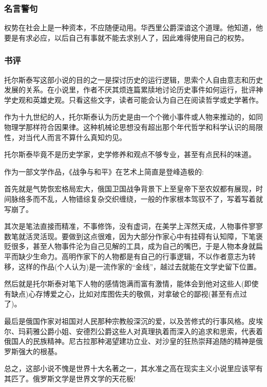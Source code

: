 \subsubsection{名言警句}

权势在社会上是一种资本，不应随便动用。华西里公爵深谙这个道理。他知道，他要是有求必应，以后自己有事就不能去求别人了，因此难得使用自己的权势。


\subsubsection{书评}
托尔斯泰写这部小说的目的之一是探讨历史的运行逻辑，思索个人自由意志和历史发展的关系。在小说里，作者不厌其烦连篇累牍地讨论历史事件如何运行，批评神学史观和英雄史观。只看这些文字，读者可能会认为自己在阅读哲学或史学著作。

作为十九世纪的人，托尔斯泰认为历史是由一个个微小事件或人物来推动的，如同物理学那样符合因果律。这种机械论思想没有超出那个年代哲学和科学认识的局限性，对当代人而言不算什么真知灼见。

托尔斯泰毕竟不是历史学家，史学修养和观点不够专业，甚至有点民科的味道。

作为一部文学作品，《战争与和平》在艺术上简直是登峰造极的:

首先就是气势恢宏格局宏大，俄国卫国战争背景下上至皇帝下至农奴都有展现，时间脉络多而不乱，人物错综复杂交织缠绕，一般的作家根本驾驭不了，写着写着就写崩了。

其次是笔法直接而精准，不事修饰，没有虚词，在美学上浑然天成，人物事件寥寥数笔就活灵活现。要做到这点很难，因为大部分作家心中有挂碍有认知障，下笔褒贬很多，甚至人物事件沦为自己见解的工具，成为自己的嘴巴，于是人物本身就扁平而缺少生命力。高明作家下的人物都是有自己的行事逻辑，不以作者意志为转移，这样的作品(个人认为)是一流作家的“金线”，越过去就能在文学史留下位置。

然后就是托尔斯泰对笔下人物的感情饱满而富有激情，能体会到他对这些人(即使有缺点)心存博爱之心，比如对库图佐夫的敬佩，对拿破仑的鄙视(甚至有点过了)。

最后是俄国作家对祖国对人民那种宗教般深沉的爱，以及苦修式的行事风格。皮埃尔、玛莉雅公爵小姐、安德烈公爵这些人对真理执着而深入的追求和思索，代表着俄国人的民族精神。尼古拉那种渴望建功立业、对沙皇的狂热崇拜追随的精神是俄罗斯强大的根基。

总之，这部小说不愧是世界十大名著之一，其水准之高在现实主义小说里应该罕有其匹了。俄罗斯文学是世界文学的天花板!